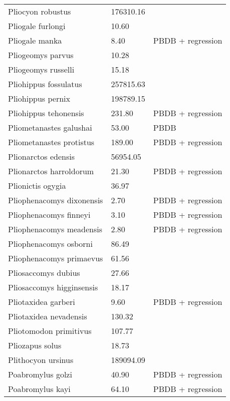 \documentclass{article}
\begin{document}
\begin{center}
\begin{longtable}{p{} p{} p{}}
    Pliocyon robustus & 176310.16 & \cite{Tomiya2013} \\ 
    Pliogale furlongi & 10.60 & \cite{Wood1962} \\ 
    Pliogale manka & 8.40 & PBDB + regression \\ 
    Pliogeomys parvus & 10.28 & \cite{Tomiya2013} \\ 
    Pliogeomys russelli & 15.18 & \cite{Tomiya2013} \\ 
    Pliohippus fossulatus & 257815.63 & \cite{Tomiya2013} \\ 
    Pliohippus pernix & 198789.15 & \cite{Tomiya2013} \\ 
    Pliohippus tehonensis & 231.80 & PBDB + regression \\ 
    Pliometanastes galushai & 53.00 & PBDB \\ 
    Pliometanastes protistus & 189.00 & PBDB + regression \\ 
    Plionarctos edensis & 56954.05 & \cite{Tomiya2013} \\ 
    Plionarctos harroldorum & 21.30 & PBDB + regression \\ 
    Plionictis ogygia & 36.97 & \cite{Tomiya2013} \\ 
    Pliophenacomys dixonensis & 2.70 & PBDB + regression \\ 
    Pliophenacomys finneyi & 3.10 & PBDB + regression \\ 
    Pliophenacomys meadensis & 2.80 & PBDB + regression \\ 
    Pliophenacomys osborni & 86.49 & \cite{Tomiya2013} \\ 
    Pliophenacomys primaevus & 61.56 & \cite{Tomiya2013} \\ 
    Pliosaccomys dubius & 27.66 & \cite{Tomiya2013} \\ 
    Pliosaccomys higginsensis & 18.17 & \cite{Tomiya2013} \\ 
    Pliotaxidea garberi & 9.60 & PBDB + regression \\ 
    Pliotaxidea nevadensis & 130.32 & \cite{Tomiya2013} \\ 
    Pliotomodon primitivus & 107.77 & \cite{Tomiya2013} \\ 
    Pliozapus solus & 18.73 & \cite{Tomiya2013} \\ 
    Plithocyon ursinus & 189094.09 & \cite{Tomiya2013} \\ 
    Poabromylus golzi & 40.90 & PBDB + regression \\ 
    Poabromylus kayi & 64.10 & PBDB + regression \\ 

\end{longtable}
\end{center}
\end{document}
